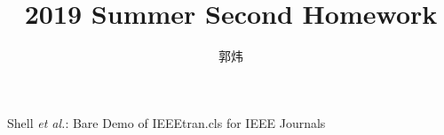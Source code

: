 \documentclass[journal]{IEEEtran}
\begin{document}
%
\title{2019 Summer Second Homework}
%
%
%
\author{郭炜}


% 
%



%
{Shell \MakeLowercase{\textit{et al.}}: Bare Demo of IEEEtran.cls for IEEE Journals}
% 
\end{document}

